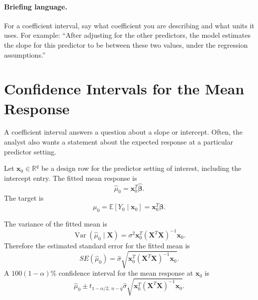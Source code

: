 \paragraph{Briefing language.}
For a coefficient interval, say what coefficient you are describing and what units it uses.  For example: ``After adjusting for the other predictors, the model estimates the slope for this predictor to be between these two values, under the regression assumptions.''

\section{Confidence Intervals for the Mean Response}

A coefficient interval answers a question about a slope or intercept.  Often, the analyst also wants a statement about the expected response at a particular predictor setting.

Let \(\mathbf{x}_0\in\mathbb{R}^{q}\) be a design row for the predictor setting of interest, including the intercept entry.  The fitted mean response is
\begin{equation}
  \widehat{\mu}_0
  =\mathbf{x}_0^T\widehat{\boldsymbol{\beta}}.
\end{equation}
The target is
\begin{equation}
  \mu_0
  =\mathbb{E}[Y_0\mid \mathbf{x}_0]
  =\mathbf{x}_0^T\boldsymbol{\beta}.
\end{equation}

The variance of the fitted mean is
\begin{equation}
  \operatorname{Var}(\widehat{\mu}_0\mid \mathbf{X})
  =\sigma^2\mathbf{x}_0^T(\mathbf{X}^T\mathbf{X})^{-1}\mathbf{x}_0.
\end{equation}
Therefore the estimated standard error for the fitted mean is
\begin{equation}
  SE(\widehat{\mu}_0)
  =\widehat{\sigma}\sqrt{\mathbf{x}_0^T(\mathbf{X}^T\mathbf{X})^{-1}\mathbf{x}_0}.
\end{equation}
A \(100(1-\alpha)\%\) confidence interval for the mean response at \(\mathbf{x}_0\) is
\begin{equation}
  \boxed{
  \widehat{\mu}_0
  \pm
  t_{1-\alpha/2,\,n-q}\widehat{\sigma}
  \sqrt{\mathbf{x}_0^T(\mathbf{X}^T\mathbf{X})^{-1}\mathbf{x}_0}.
  }
  \label{eq:ch13-mean-response-ci}
\end{equation}

